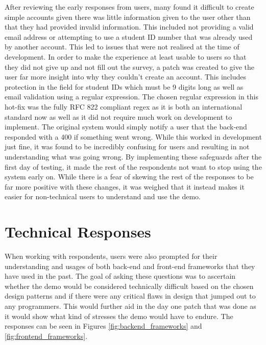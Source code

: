 After reviewing the early responses from users, many found it difficult to create simple accounts given there was little information given to the user other than that they had provided invalid information. This included not providing a valid email address or attempting to use a student ID number that was already used by another account. This led to issues that were not realised at the time of development. 
\newline
\newline
In order to make the experience at least usable to users so that they did not give up and not fill out the survey, a patch was created to give the user far more insight into why they couldn’t create an account. This includes protection in the field for student IDs which must be 9 digits long as well as email validation using a regular expression. The chosen regular expression in this hot-fix was the fully RFC 822 compliant regex as it is both an international standard now as well as it did not require much work on development to implement.
\newline
\newline
The original system would simply notify a user that the back-end responded with a 400 if something went wrong. While this worked in development just fine, it was found to be incredibly confusing for users and resulting in not understanding what was going wrong. By implementing these safeguards after the first day of testing, it made the rest of the respondents not want to stop using the system early on. While there is a fear of skewing the rest of the responses to be far more positive with these changes, it was weighed that it instead makes it easier for non-technical users to understand and use the demo. 

\section{Technical Responses}

When working with respondents, users were also prompted for their understanding and usages of both back-end and front-end frameworks that they have used in the past. The goal of asking these questions was to ascertain whether the demo would be considered technically difficult based on the chosen design patterns and if there were any critical flaws in design that jumped out to any programmers. This would further aid in the day one patch that was done as it would show what kind of stresses the demo would have to endure. The responses can be seen in Figures \ref{fig:backend_frameworks} and \ref{fig:frontend_frameworks}.

